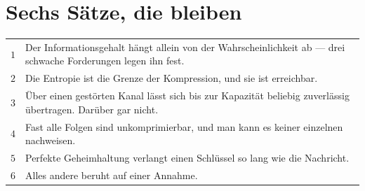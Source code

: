 \section{Sechs Sätze, die bleiben}

\begin{merksatz}
\begin{center}
{\small
\renewcommand{\arraystretch}{1.55}
\begin{tabular}{@{}P{0.7cm}P{7.7cm}@{}}
\toprule
$1$ & Der Informationsgehalt hängt allein von der Wahrscheinlichkeit ab --- drei schwache Forderungen legen ihn fest.\\
$2$ & Die Entropie ist die Grenze der Kompression, und sie ist erreichbar.\\
$3$ & Über einen gestörten Kanal lässt sich bis zur Kapazität beliebig zuverlässig übertragen. Darüber gar nicht.\\
$4$ & Fast alle Folgen sind unkomprimierbar, und man kann es keiner einzelnen nachweisen.\\
$5$ & Perfekte Geheimhaltung verlangt einen Schlüssel so lang wie die Nachricht.\\
$6$ & Alles andere beruht auf einer Annahme.\\
\bottomrule
\end{tabular}}
\end{center}
\end{merksatz}

